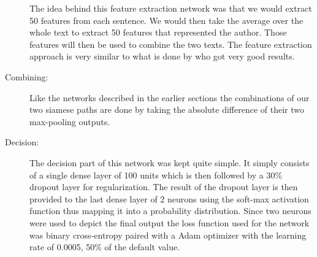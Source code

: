 \begin{description}
        The idea behind this feature extraction network was that we would
        extract 50 features from each sentence. We would then take the average
        over the whole text to extract 50 features that represented the author.
        Those features will then be used to combine the two texts. The feature
        extraction approach is very similar to what is done by
        \citet{qian:2018} who got very good results.

    \item[Combining:]

        Like the networks described in the earlier sections the combinations
        of our two siamese paths are done by taking the absolute difference
        of their two max-pooling outputs.

    \item[Decision:]

        The decision part of this network was kept quite simple. It simply
        consists of a single dense layer of 100 units which is then followed
        by a 30\% dropout layer for regularization. The result of the dropout
        layer is then provided to the last dense layer of 2 neurons using
        the soft-max activation function thus mapping it into a probability
        distribution. Since two neurons were used to depict the final output
        the loss function used for the network was binary cross-entropy paired
        with a \gls{Adam} optimizer with the learning rate of 0.0005, 50\% of
        the default value.

\end{description}

